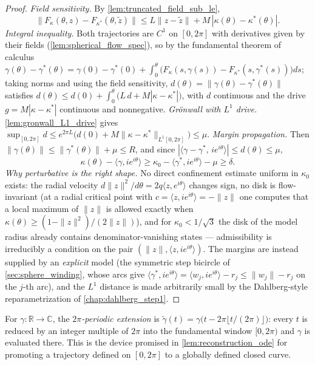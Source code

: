 \begin{proof}

\leanok
  \emph{Field sensitivity.} By \cref{lem:truncated_field_sub_le},
  \[
    \|F_{\kappa}(\theta,z)-F_{\kappa^\ast}(\theta,\tilde z)\|
    \le L\|z-\tilde z\|+M\,|\kappa(\theta)-\kappa^\ast(\theta)| .
  \]
  \emph{Integral inequality.} Both trajectories are $C^1$ on $[0,2\pi]$ with derivatives
  given by their fields (\cref{lem:spherical_flow_spec}), so by the fundamental theorem
  of calculus $\gamma(\theta)-\gamma^\ast(\theta)=\gamma(0)-\gamma^\ast(0)+\int_0^\theta\bigl(F_\kappa(s,
  \gamma(s))-F_{\kappa^\ast}(s,\gamma^\ast(s))\bigr)ds$; taking norms and using the field
  sensitivity, $d(\theta)=\|\gamma(\theta)-\gamma^\ast(\theta)\|$ satisfies
  $d(\theta)\le d(0)+\int_0^\theta\bigl(L\,d+M|\kappa-\kappa^\ast|\bigr)$, with $d$
  continuous and the drive $g=M|\kappa-\kappa^\ast|$ continuous and nonnegative.
  \emph{Gr\"onwall with $L^1$ drive.} \cref{lem:gronwall_L1_drive} gives
  $\sup_{[0,2\pi]}d\le e^{2\pi L}\bigl(d(0)+M\|\kappa-\kappa^\ast\|_{L^1[0,2\pi]}\bigr)
   \le\mu$.
  \emph{Margin propagation.} Then
  $\|\gamma(\theta)\|\le\|\gamma^\ast(\theta)\|+\mu\le R$, and since
  $|\langle \gamma-\gamma^\ast,\,i e^{i\theta}\rangle|\le d(\theta)\le\mu$,
  \[
    \kappa(\theta)-\langle \gamma,i e^{i\theta}\rangle
    \ge\kappa_0-\langle \gamma^\ast,i e^{i\theta}\rangle-\mu\ge\delta .
  \]
  \emph{Why perturbative is the right shape.} No direct confinement estimate uniform in
  $\kappa_0$ exists: the radial velocity $d\|z\|^2/d\theta=2q\langle z,e^{i\theta}\rangle$
  changes sign, no disk is flow-invariant (at a radial critical point with
  $c=\langle z,ie^{i\theta}\rangle=-\|z\|$ one computes that a local maximum of $\|z\|$ is
  allowed exactly when $\kappa(\theta)\ge(1-\|z\|^2)/(2\|z\|)$), and for
  $\kappa_0<1/\sqrt3$ the disk of the model radius already contains denominator-vanishing
  states — admissibility is irreducibly a condition on the pair
  $(\|z\|,\langle z,ie^{i\theta}\rangle)$. The margins are instead supplied by an
  \emph{explicit} model (the symmetric step bicircle of \cref{sec:sphere_winding}, whose
  arcs give $\langle \gamma^\ast,ie^{i\theta}\rangle=\langle w_j,ie^{i\theta}\rangle-r_j
  \le\|w_j\|-r_j$ on the $j$-th arc), and the $L^1$ distance is made arbitrarily small by
  the Dahlberg-style reparametrization of \cref{chap:dahlberg_step1}.
\end{proof}

\begin{definition}
  \label{def:periodic_extension}
  For $\gamma:\mathbb R\to\mathbb C$, the \emph{$2\pi$-periodic extension} is
  $\tilde\gamma(t)=\gamma\bigl(t-2\pi\lfloor t/(2\pi)\rfloor\bigr)$: every $t$ is reduced by an
  integer multiple of $2\pi$ into the fundamental window $[0,2\pi)$ and $\gamma$ is evaluated
  there. This is the device promised in \cref{lem:reconstruction_ode} for promoting a
  trajectory defined on $[0,2\pi]$ to a globally defined closed curve.
\end{definition}

